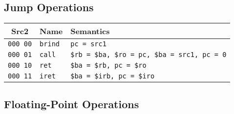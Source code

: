 \documentclass[10pt,DIV12]{scrartcl}
\begin{document}
\subsection{Jump Operations}
\label{sec:jop}

\begin{tabular}{cll}
\toprule
Src2 & Name & Semantics \\
\midrule
\texttt{000 00} & \texttt{brind} & \texttt{pc = src1} \\
\texttt{000 01} & \texttt{call} & \texttt{\$rb = \$ba, \$ro = pc, \$ba = src1, pc = 0} \\
\texttt{000 10} & \texttt{ret} & \texttt{\$ba = \$rb, pc = \$ro} \\
\texttt{000 11} & \texttt{iret} & \texttt{\$ba = \$irb, pc = \$iro} \\
\bottomrule  
\end{tabular}

\subsection{Floating-Point Operations}
\label{sec:fop}
\end{document}
